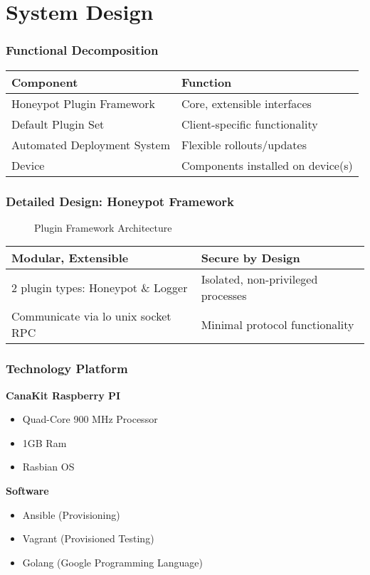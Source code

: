 \section{System Design}

\begin{frame}
\frametitle{Functional Decomposition}

\begin{tabular}{l | l}
\toprule
\textbf{Component} & \textbf{Function} \\
\midrule
Honeypot Plugin Framework & Core, extensible interfaces \\
Default Plugin Set & Client-specific functionality \\
Automated Deployment System & Flexible rollouts/updates \\
Device & Components installed on device(s) \\
\bottomrule
\end{tabular}

\end{frame}

\begin{frame}
\frametitle{Detailed Design: Honeypot Framework}

\begin{figure}
\centering
\caption{Plugin Framework Architecture}
{
\scalebox{0.7}{}
}
\end{figure}

\begin{table}
\centering
\small
\begin{tabularx}{\linewidth}{l l}
\textbf{Modular, Extensible} & \textbf{Secure by Design} \\
\midrule
2 plugin types: Honeypot \& Logger & Isolated, non-privileged processes \\
Communicate via lo unix socket RPC & Minimal protocol functionality \\
\end{tabularx}
\end{table}
\end{frame}

\begin{frame}
\frametitle{Technology Platform}
\textbf{CanaKit Raspberry PI}
\begin{itemize}
\item Quad-Core 900 MHz Processor
\item 1GB Ram
\item Rasbian OS
\end{itemize}

\textbf{Software}
\begin{itemize}
\item Ansible (Provisioning)
\item Vagrant (Provisioned Testing)
\item Golang (Google Programming Language)
\end{itemize}


\end{frame}

